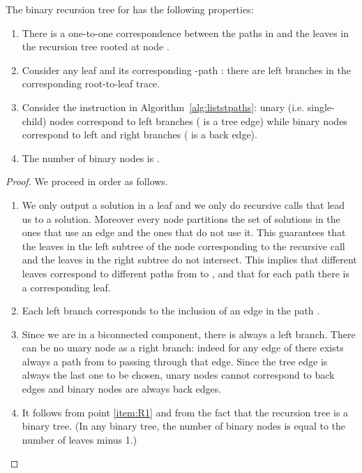 \begin{lemma}
\label{lem:properties_recursion}
The binary recursion tree  for  has the following properties: 
\begin{enumerate}
	\setlength{\itemsep}{0pt} 
\item \label{item:R1} There is a one-to-one correspondence between the
  paths in  and the leaves in the recursion
  tree rooted at node .
\item \label{item:R2} Consider any leaf and its corresponding -path
  : there are  left branches in
  the corresponding root-to-leaf trace.
\item \label{item:R3} Consider the instruction 
  in Algorithm~\ref{alg:liststpaths}: unary (i.e.\mbox{} single-child)
  nodes correspond to left branches ( is a tree edge) while binary
  nodes correspond to left and right branches ( is a back
  edge).
\item \label{item:R4} The number of binary nodes is
  .
\end{enumerate}
\end{lemma}
\begin{proof}
We proceed in order as follows.
\begin{enumerate}
\item We only output a solution in a leaf and we only do recursive
  calls that lead us to a solution. Moreover every node partitions the
  set of solutions in the ones that use an edge and the ones that do
  not use it. This guarantees that the leaves in the left subtree of
  the node corresponding to the recursive call and the leaves in the
  right subtree do not intersect. This implies that different leaves
  correspond to different paths from  to , and that for each
  path there is a corresponding leaf.
\item Each left branch corresponds to the inclusion of an edge in the
  path .
\item Since we are in a biconnected component, there is always a left
  branch. There can be no unary node as a right branch: indeed for any
  edge of  there exists always a path from  to 
  passing through that edge. Since the tree edge is always the last
  one to be chosen, unary nodes cannot correspond to back edges and
  binary nodes are always back edges.
\item It follows from point \ref{item:R1} and from the fact that the recursion tree is
  a binary tree. (In any binary tree, the number of binary nodes is
  equal to the number of leaves minus 1.)
\end{enumerate}
\end{proof}

